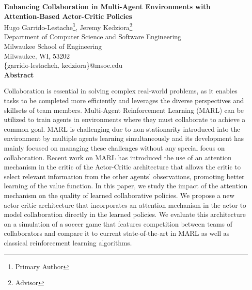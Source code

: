 \documentclass[12pt]{article}
\begin{document}
\thispagestyle{empty} 

\begin{center}
    \vspace*{1.5in}
    {\fontsize{18}{22}\selectfont \textbf{Enhancing Collaboration in Multi-Agent Environments with Attention-Based Actor-Critic Policies}}\\[2\baselineskip]

    {\fontsize{14}{17}\selectfont Hugo Garrido-Lestache\footnote{Primary Author}, Jeremy Kedziora\footnote{Advisor}}\\
    {\fontsize{14}{17}\selectfont Department of Computer Science and Software Engineering}\\
    {\fontsize{14}{17}\selectfont Milwaukee School of Engineering}\\
    {\fontsize{14}{17}\selectfont Milwaukee, WI, 53202}\\
    {\fontsize{14}{17}\selectfont \{garrido-lestacheh, kedziora\}@msoe.edu}\\[2\baselineskip]

    {\bfseries \fontsize{16}{19}\selectfont Abstract}\\[1\baselineskip]

    \parbox{0.85\textwidth}{
        \fontsize{12}{14}\selectfont
        Collaboration is essential in solving complex real-world problems, as it enables tasks to be completed more efficiently and leverages the diverse perspectives and skillsets of team members.
        Multi-Agent Reinforcement Learning (MARL) can be utilized to train agents in environments where they must collaborate to achieve a common goal. 
        MARL is challenging due to non-stationarity introduced into the environment by multiple agents learning simultaneously and its development has mainly focused on managing these challenges without any special focus on collaboration. 
        Recent work on MARL has introduced the use of an attention mechanism in the critic of the Actor-Critic architecture that allows the critic to select relevant information from the other agents' observations, promoting better learning of the value function.
        In this paper, we study the impact of the attention mechanism on the quality of learned collaborative policies. 
        We propose a new actor-critic architecture that incorporates an attention mechanism in the actor to model collaboration directly in the learned policies.  
        We evaluate this architecture on a simulation of a soccer game that features competition between teams of collaborators and compare it to current state-of-the-art in MARL as well as classical reinforcement learning algorithms.
        
    }
\end{center}
\end{document}
